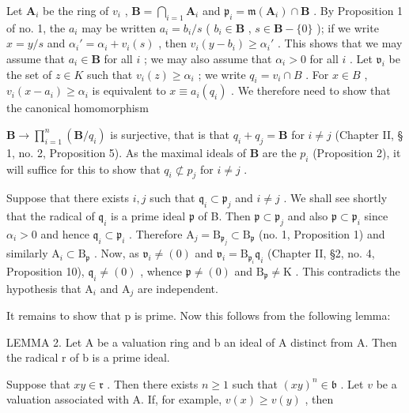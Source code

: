 Let \(\mathbf{A}_i\) be the ring of \(v_i\) , \(\mathbf{B} = \bigcap_{i=1} \mathbf{A}_i\) and \(\mathfrak{p}_i = \mathfrak{m}(\mathbf{A}_i) \cap \mathbf{B}\) . By Proposition 1 of no. 1, the \(a_i\) may be written \(a_i = b_i / s\) ( \(b_i \in \mathbf{B}\) , \(s \in \mathbf{B} - \{0\}\) ); if we write \(x = y / s\) and \(\alpha_i' = \alpha_i + v_i(s)\) , then \(v_i(y - b_i) \geqslant \alpha_i'\) . This shows that we may assume that \(a_i \in \mathbf{B}\) for all \(i\) ; we may also assume that \(\alpha_i > 0\) for all \(i\) . Let \(\mathfrak{v}_i\) be the set of \(z \in K\) such that \(v_{i}(z) \geqslant \alpha_{i}\) ; we write \(q_{i} = v_{i} \cap B\) . For \(x \in B\) , \(v_{i}(x - a_{i}) \geqslant \alpha_{i}\) is equivalent to \(x \equiv a_{i}(q_{i})\) . We therefore need to show that the canonical homomorphism

\(\mathbf{B} \to \prod_{i=1}^{n} \left( \mathbf{B} / q_i \right)\) is surjective, that is that \(q_i + q_j = \mathbf{B}\) for \(i \neq j\) (Chapter II, § 1, no. 2, Proposition 5). As the maximal ideals of \(\mathbf{B}\) are the \(p_i\) (Proposition 2), it will suffice for this to show that \(q_i \not\subset p_j\) for \(i \neq j\) .

Suppose that there exists \(i, j\) such that \(\mathfrak{q}_i \subset \mathfrak{p}_j\) and \(i \neq j\) . We shall see shortly that the radical of \(\mathfrak{q}_i\) is a prime ideal \(\mathfrak{p}\) of B. Then \(\mathfrak{p} \subset \mathfrak{p}_j\) and also \(\mathfrak{p} \subset \mathfrak{p}_i\) since \(\alpha_i > 0\) and hence \(\mathfrak{q}_i \subset \mathfrak{p}_i\) . Therefore \(\mathrm{A}_j = \mathrm{B}_{\mathfrak{p}_j} \subset \mathrm{B}_{\mathfrak{p}}\) (no. 1, Proposition 1) and similarly \(\mathrm{A}_i \subset \mathrm{B}_{\mathfrak{p}}\) . Now, as \(\mathfrak{v}_i \neq (0)\) and \(\mathfrak{v}_i = \mathrm{B}_{\mathfrak{p}_i} \mathfrak{q}_i\) (Chapter II, §2, no. 4, Proposition 10), \(\mathfrak{q}_i \neq (0)\) , whence \(\mathfrak{p} \neq (0)\) and \(\mathrm{B}_{\mathfrak{p}} \neq \mathrm{K}\) . This contradicts the hypothesis that \(\mathrm{A}_i\) and \(\mathrm{A}_j\) are independent.

It remains to show that p is prime. Now this follows from the following lemma:

LEMMA 2. Let A be a valuation ring and b an ideal of A distinct from A. Then the radical r of b is a prime ideal.

Suppose that \(xy \in \mathfrak{r}\) . Then there exists \(n \geqslant 1\) such that \((xy)^n \in \mathfrak{b}\) . Let \(v\) be a valuation associated with A. If, for example, \(v(x) \geqslant v(y)\) , then

